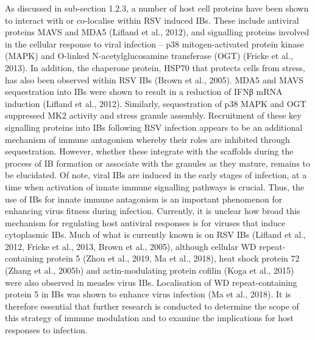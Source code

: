 As discussed in sub-section 1.2.3, a number of host cell proteins have been shown to interact with or co-localise within RSV induced IBs. These include antiviral proteins MAVS and MDA5 (Lifland et al., 2012), and signalling proteins involved in the cellular response to viral infection – p38 mitogen-activated protein kinase (MAPK) and O-linked N-acetylglucosamine transferase (OGT) (Fricke et al., 2013). In addition, the chaperone protein, HSP70 that protects cells from stress, has also been observed within RSV IBs (Brown et al., 2005). MDA5 and MAVS sequestration into IBs were shown to result in a reduction of IFNβ mRNA induction (Lifland et al., 2012). Similarly, sequestration of p38 MAPK and OGT suppressed MK2 activity and stress granule assembly. Recruitment of these key signalling proteins into IBs following RSV infection appears to be an additional mechanism of immune antagonism whereby their roles are inhibited through sequestration. However, whether these integrate with the scaffolds during the process of IB formation or associate with the granules as they mature, remains to be elucidated. Of note, viral IBs are induced in the early stages of infection, at a time when activation of innate immune signalling pathways is crucial. Thus, the use of IBs for innate immune antagonism is an important phenomenon for enhancing virus fitness during infection. Currently, it is unclear how broad this mechanism for regulating host antiviral responses is for viruses that induce cytoplasmic IBs. Much of what is currently known is on RSV IBs (Lifland et al., 2012, Fricke et al., 2013, Brown et al., 2005), although cellular WD repeat-containing protein 5 (Zhou et al., 2019, Ma et al., 2018), heat shock protein 72 (Zhang et al., 2005b) and actin-modulating protein cofilin (Koga et al., 2015) were also observed in measles virus IBs. Localisation of WD repeat-containing protein 5 in IBs was shown to enhance virus infection (Ma et al., 2018). It is therefore essential that further research is conducted to determine the scope of this strategy of immune modulation and to examine the implications for host responses to infection.

